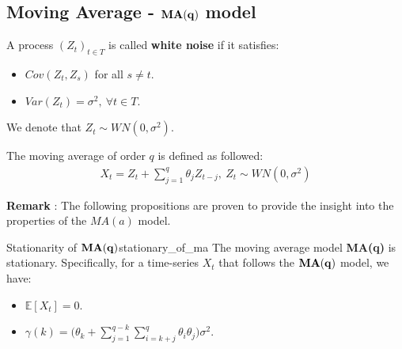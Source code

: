 \subsection{Moving Average - $\bf MA(q)$ model}
\begin{definition}
    A process $(Z_t)_{t\in T}$ is called \textbf{white noise} if it satisfies:
    \begin{itemize}
        \item $Cov(Z_t, Z_s)$ for all $s\ne t$.
        \item $Var(Z_t) = \sigma^2, \ \forall t\in T$.
    \end{itemize}

    \noindent We denote that $Z_t\sim WN(0, \sigma^2)$.
\end{definition}

\begin{definition}[$\bf MA(q)$ model]
    The moving average of order $q$ is defined as followed:
    \begin{align*}
        X_t = Z_t + \sum_{j=1}^q \theta_j Z_{t-j}, \ Z_t\sim WN(0,\sigma^2)
    \end{align*}
\end{definition}

\textbf{Remark} : The following propositions are proven to provide the insight into the properties of the $MA(a)$ model.

\begin{proposition}{Stationarity of $\bf MA(q)$}{stationary_of_ma}
    The moving average model \textbf{MA(q)} is stationary. Specifically, for a time-series $X_t$ that follows the ${\bf MA(q)}$ model, we have:
    \begin{itemize}
        \item $\mathbb{E}[X_t] = 0$.
        \item $\gamma(k) = \Bigg( \theta_k + \sum_{j=1}^{q-k}\sum_{i=k+j}^q \theta_i \theta_j \Bigg)\sigma^2$.
    \end{itemize}
\end{proposition}

